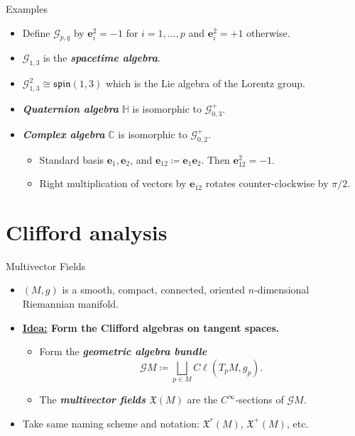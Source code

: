 \documentclass[aspectratio=169]{beamer}
\newcommand\boldgreen[1]{\textcolor{lighter_csu_green}{\emph{\textbf{#1}}}}
\newcommand\boldgold[1]{\textcolor{csu_gold}{\textbf{#1}}}
\newcommand{\C}{\mathbb{C}}
\newcommand{\G}{\mathcal{G}}
\newcommand{\blade}[1]{\boldsymbol{#1}}
\newcommand{\smoothfields}{\mathfrak{X}}
\begin{document}
\begin{frame}{Examples}
\vfill
\begin{itemize}
\pause
\item Define $\G_{p,q}$ by $\blade{e}_i^2=-1$ for $i=1,\dots,p$ and $\blade{e}_i^2=+1$ otherwise.
\pause
\item \boldgold{$\G_{1,3}$} is the \boldgreen{spacetime algebra}.
\pause
\item $\G_{1,3}^2 \cong \mathfrak{spin}(1,3)$ which is the Lie algebra of the Lorentz group.
\pause
\item \boldgreen{Quaternion algebra} \boldgold{$\mathbb{H}$} is isomorphic to $\G_{0,3}^+$.
\pause
\item \boldgreen{Complex algebra}  \boldgold{$\C$} is isomorphic to $\G_{0,2}^+$.
\begin{itemize}
\pause
\item Standard basis $\blade{e}_1,\blade{e}_2$, and $\blade{e}_{12}\coloneqq \blade{e}_1\blade{e}_2$. Then $\blade{e}_{12}^2 = -1$.
\pause
\item Right multiplication of vectors by $\blade{e}_{12}$ rotates counter-clockwise by $\pi/2$.
\end{itemize}
\end{itemize}
\vfill
\end{frame}

\section{Clifford analysis}

\begin{frame}{Multivector Fields}
\vfill
\begin{itemize}
\pause
\item $(M,g)$ is a smooth, compact, connected, oriented $n$-dimensional Riemannian manifold.
\pause
\item \noindent\boldgold{{\underline{Idea:}} Form the Clifford algebras on tangent spaces.}
    \begin{itemize}
        \pause
        \item Form the \boldgreen{geometric algebra bundle}
        \[
        \G M \coloneqq \bigsqcup_{p\in M} C\ell(T_pM,g_p).
        \]
        \pause
        \item The \boldgreen{multivector fields $\smoothfields(M)$} are the $C^\infty$-sections of $\G M$.
    \end{itemize}
    \pause
    \item Take same naming scheme and notation: $\smoothfields^r(M)$, $\smoothfields^+(M)$, etc.
\end{itemize}
\vfill
\end{frame}
\end{document}
